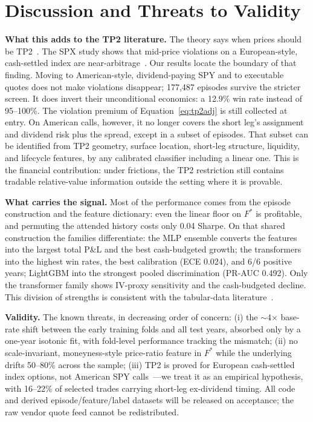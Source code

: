 \documentclass[sigconf,review]{acmart}
\begin{document}
\section{Discussion and Threats to Validity}
\label{sec:limitations}

\noindent\textbf{What this adds to the TP2 literature.} The theory says when prices should be TP2~\cite{glasserman2026tp2theory}. The SPX study shows that mid-price violations on a European-style, cash-settled index are near-arbitrage~\cite{glasserman2025tp2}. Our results locate the boundary of that finding. Moving to American-style, dividend-paying SPY and to executable quotes does not make violations disappear; 177{,}487 episodes survive the stricter screen. It does invert their unconditional economics: a 12.9\% win rate instead of 95--100\%. The violation premium of Equation~\eqref{eq:tp2adj} is still collected at entry. On American calls, however, it no longer covers the short leg's assignment and dividend risk plus the spread, except in a subset of episodes. That subset can be identified from TP2 geometry, surface location, short-leg structure, liquidity, and lifecycle features, by any calibrated classifier including a linear one. This is the financial contribution: under frictions, the TP2 restriction still contains tradable relative-value information outside the setting where it is provable.

\noindent\textbf{What carries the signal.} Most of the performance comes from the episode construction and the feature dictionary: even the linear floor on $F^{\ast}$ is profitable, and permuting the attended history costs only 0.04 Sharpe. On that shared construction the families differentiate: the MLP ensemble converts the features into the largest total P\&L and the best cash-budgeted growth; the transformers into the highest win rates, the best calibration (ECE 0.024), and 6/6 positive years; LightGBM into the strongest pooled discrimination (PR-AUC 0.492). Only the transformer family shows IV-proxy sensitivity and the cash-budgeted decline. This division of strengths is consistent with the tabular-data literature~\cite{grinsztajn2022why,gorishniy2021revisiting}.

\noindent\textbf{Validity.} The known threats, in decreasing order of concern: (i) the $\sim$4$\times$ base-rate shift between the early training folds and all test years, absorbed only by a one-year isotonic fit, with fold-level performance tracking the mismatch; (ii) no scale-invariant, moneyness-style price-ratio feature in $F^{\ast}$ while the underlying drifts 50--80\% across the sample; (iii) TP2 is proved for European cash-settled index options, not American SPY calls~\cite{glasserman2026tp2theory,cosma2020earlyexercise}---we treat it as an empirical hypothesis, with 16--22\% of selected trades carrying short-leg ex-dividend timing. All code and derived episode/feature/label datasets will be released on acceptance; the raw vendor quote feed cannot be redistributed.
\end{document}
